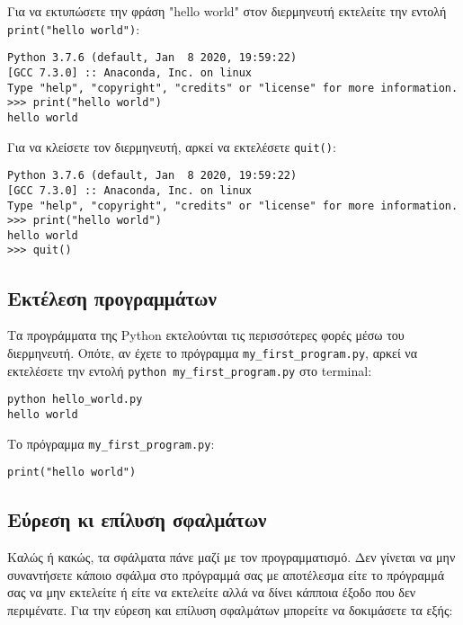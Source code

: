 \documentclass[14pt]{extreport}
\begin{document}
Για να εκτυπώσετε την φράση "hello world" στον διερμηνευτή εκτελείτε  την εντολή \lstinline{print("hello world")}:
\begin{lstlisting}
Python 3.7.6 (default, Jan  8 2020, 19:59:22) 
[GCC 7.3.0] :: Anaconda, Inc. on linux
Type "help", "copyright", "credits" or "license" for more information.
>>> print("hello world")
hello world
\end{lstlisting}

Για να κλείσετε τον διερμηνευτή, αρκεί να εκτελέσετε \lstinline{quit()}:

\begin{lstlisting}
Python 3.7.6 (default, Jan  8 2020, 19:59:22) 
[GCC 7.3.0] :: Anaconda, Inc. on linux
Type "help", "copyright", "credits" or "license" for more information.
>>> print("hello world")
hello world
>>> quit()
\end{lstlisting}

\subsection{Εκτέλεση προγραμμάτων}

Τα προγράμματα της Python εκτελούνται τις περισσότερες φορές μέσω του διερμηνευτή. Οπότε, αν έχετε το πρόγραμμα \lstinline{my_first_program.py}, αρκεί να εκτελέσετε την εντολή \lstinline{python my_first_program.py} στο terminal:

\begin{lstlisting}
python hello_world.py
hello world    
\end{lstlisting}

Το πρόγραμμα \lstinline{my_first_program.py}:
\begin{lstlisting}
print("hello world")
\end{lstlisting}

\subsection{Εύρεση κι επίλυση σφαλμάτων}

Καλώς ή κακώς, τα σφάλματα πάνε μαζί με τον προγραμματισμό. Δεν γίνεται να μην συναντήσετε κάποιο σφάλμα στο πρόγραμμά σας με αποτέλεσμα είτε το πρόγραμμά σας να μην εκτελείτε ή είτε να εκτελείτε αλλά να δίνει κάπποια έξοδο που δεν περιμένατε. Για την εύρεση και επίλυση σφαλμάτων μπορείτε να δοκιμάσετε τα εξής:
\end{document}
